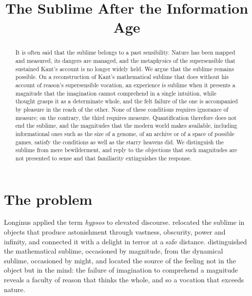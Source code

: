 \documentclass{situationist-preprint}
\title{The Sublime After the Information Age}
\begin{document}
\maketitle

\begin{abstract}
It is often said that the sublime belongs to a past sensibility. Nature has been mapped and measured, its dangers are managed, and the metaphysics of the supersensible that sustained Kant's account is no longer widely held. We argue that the sublime remains possible. On a reconstruction of Kant's mathematical sublime that does without his account of reason's supersensible vocation, an experience is sublime when it presents a magnitude that the imagination cannot comprehend in a single intuition, while thought grasps it as a determinate whole, and the felt failure of the one is accompanied by pleasure in the reach of the other. None of these conditions requires ignorance of measure; on the contrary, the third requires measure. Quantification therefore does not end the sublime, and the magnitudes that the modern world makes available, including informational ones such as the size of a genome, of an archive or of a space of possible games, satisfy the conditions as well as the starry heavens did. We distinguish the sublime from mere bewilderment, and reply to the objections that such magnitudes are not presented to sense and that familiarity extinguishes the response.
\end{abstract}

\section{The problem}

Longinus applied the term \emph{hypsos} to elevated discourse. \citet{Burke1757} relocated the sublime in objects that produce astonishment through vastness, obscurity, power and infinity, and connected it with a delight in terror at a safe distance. \citet[\S\S 23--29]{Kant1790} distinguished the mathematical sublime, occasioned by magnitude, from the dynamical sublime, occasioned by might, and located the source of the feeling not in the object but in the mind: the failure of imagination to comprehend a magnitude reveals a faculty of reason that thinks the whole, and so a vocation that exceeds nature.
\end{document}
